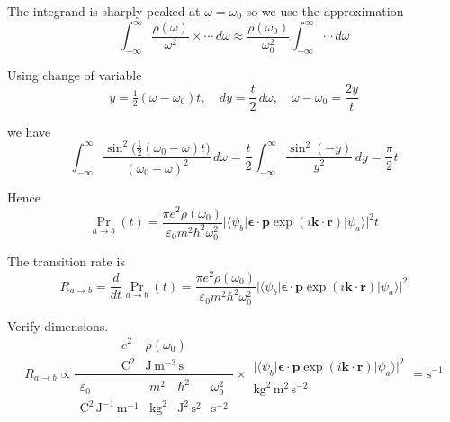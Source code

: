 The integrand is sharply peaked at $\omega=\omega_0$ so we use the approximation
\begin{equation*}
\int_{-\infty}^\infty\frac{\rho(\omega)}{\omega^2}
\times\cdots
\,d\omega
\approx\frac{\rho(\omega_0)}{\omega_0^2}
\int_{-\infty}^\infty
\cdots
\,d\omega
\end{equation*}

Using change of variable
\begin{equation*}
y=\tfrac{1}{2}(\omega-\omega_0)t,\quad
dy=\frac{t}{2}\,d\omega,\quad
\omega-\omega_0=\frac{2y}{t}
\end{equation*}

we have
\begin{equation*}
\int_{-\infty}^\infty
\frac{\sin^2\bigl(\tfrac{1}{2}(\omega_0-\omega)t\bigr)}{(\omega_0-\omega)^2}\,d\omega
=\frac{t}{2}\int_{-\infty}^\infty\frac{\sin^2(-y)}{y^2}\,dy
=\frac{\pi}{2}t
\end{equation*}

Hence
\begin{equation*}
\Pr_{a\rightarrow b}(t)
=\frac{\pi e^2\rho(\omega_0)}{\varepsilon_0m^2\hbar^2\omega_0^2}
\bigl|\langle\psi_b|\boldsymbol{\epsilon}\cdot\mathbf p\exp(i\mathbf k\cdot\mathbf r)|\psi_a\rangle\bigr|^2
t
\end{equation*}

The transition rate is
\begin{equation*}
R_{a\rightarrow b}=\frac{d}{dt}\Pr_{a\rightarrow b}(t)
=\frac{\pi e^2\rho(\omega_0)}{\varepsilon_0m^2\hbar^2\omega_0^2}
\bigl|\langle\psi_b|\boldsymbol{\epsilon}\cdot\mathbf p\exp(i\mathbf k\cdot\mathbf r)|\psi_a\rangle\bigr|^2
\end{equation*}

Verify dimensions.
\begin{equation*}
R_{a\rightarrow b}\propto
\frac{\begin{matrix}
e^2 & \rho(\omega_0)
\\
\text{C}^2 & \text{J}\,\text{m}^{-3}\,\text{s}
\end{matrix}
}{\begin{matrix}
\varepsilon_0 & m^2 & \hbar^2 & \omega_0^2
\\
\text{C}^2\,\text{J}^{-1}\,\text{m}^{-1}
& \text{kg}^2 & \text{J}^2\,\text{s}^2 & \text{s}^{-2}
\end{matrix}}
\times
\begin{matrix}
\\
\bigl|\langle\psi_b|\boldsymbol{\epsilon}\cdot\mathbf p\exp(i\mathbf k\cdot\mathbf r)|\psi_a\rangle\bigr|^2
\\
\text{kg}^2\,\text{m}^2\,\text{s}^{-2}
\end{matrix}
=\text{s}^{-1}
\end{equation*}


